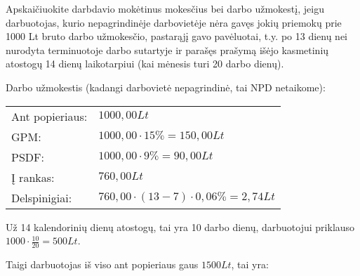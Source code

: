 \begin{tasks}
\begin{task}
\begin{solution}
    \end{solution}
  \end{task}

  \begin{task}
    \begin{condition}
      Apskaičiuokite darbdavio mokėtinus mokesčius bei darbo
      užmokestį, jeigu darbuotojas, kurio nepagrindinėje
      darbovietėje nėra gavęs jokių priemokų prie 1000 Lt bruto
      darbo užmokesčio, pastarąjį gavo pavėluotai, t.y. po 13
      dienų nei nurodyta terminuotoje darbo sutartyje ir parašęs
      prašymą išėjo kasmetinių atostogų 14 dienų laikotarpiui
      (kai mėnesis turi 20 darbo dienų).
    \end{condition}
    \begin{solution}
      Darbo užmokestis (kadangi darbovietė nepagrindinė, tai
      NPD netaikome):

      \begin{tabularx}{15cm}{p{7.5cm}|p{7.5cm}}
        Ant popieriaus: & $1000,00Lt$ \\
        GPM: & $1000,00 \cdot 15\% = 150,00Lt$ \\
        PSDF: & $1000,00 \cdot 9\% = 90,00Lt$ \\
        Į rankas: & $760,00Lt$ \\
        Delspinigiai: & $760,00 \cdot (13 - 7) \cdot 0,06\% = 2,74Lt$ \\
      \end{tabularx}

      Už 14 kalendorinių dienų atostogų, tai yra 10 darbo dienų,
      darbuotojui priklauso $1000 \cdot \frac{10}{20} = 500 Lt$.

      Taigi darbuotojas iš viso ant popieriaus gaus $1500 Lt$,
      tai yra:

      
    \end{solution}
  \end{task}
\end{tasks}
